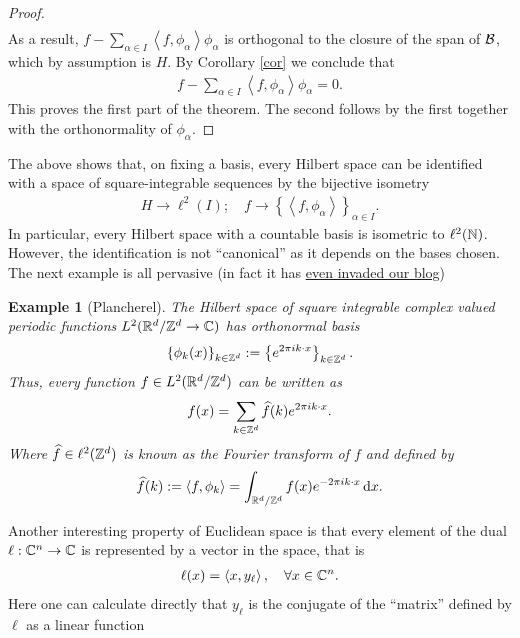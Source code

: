 \documentclass[12pt]{article}
\newtheorem{example}{Example}
\newcommand{\br}[1]{\left\langle#1\right\rangle} \newcommand{\set}[1]{\left\{#1\right\}}\newcommand{\qt}[1]{\left(#1\right)} \newcommand{\qp}[1]{\left(#1\right)}\newcommand{\qb}[1]{\left[#1\right]}
\renewcommand{\d}{\,\mathrm{d}}
\begin{document}
\begin{CJK*}{UTF8}{gbsn}
\begin{proof}
\begin{align*}
		\end{align*}
		As a result, $f-\sum_{\alpha \in  I} \br{f,\phi_\alpha}\phi_\alpha$ is orthogonal to the closure of the span of $\mathcal{B}$, which by assumption is $H$. By Corollary
		\ref{cor} we conclude that
		\begin{align*}
			f-\sum_{\alpha \in  I} \br{f,\phi_\alpha}\phi_\alpha=0.
		\end{align*}
		This proves the first part of the theorem. The second follows by the first together with the orthonormality of $\phi_\alpha$.
	\end{proof}
	The above shows that, on fixing a basis, every Hilbert space can be identified with a space of square-integrable sequences by the bijective isometry
	\begin{align*}
		H\to \ell ^2(I); \quad f \to \set{\br{f,\phi_{\alpha}}}_{\alpha \in I}.
	\end{align*}
	In particular, every Hilbert space with a countable basis is isometric to $\ell ^2(\mathbb{N})$. However, the identification is not ``canonical'' as it depends on the bases chosen. The next example is all pervasive (in fact it has \href{https://nowheredifferentiable.com/2023-01-29-PDE-1/}{even invaded our blog})
	\begin{example}[Plancherel]
		The Hilbert space of square integrable complex valued periodic functions $L^2(\mathbb{R}^d /\mathbb{Z}^d \to \mathbb{C})$ has orthonormal basis
		\begin{align*}
			\set{\phi_k(x)}_{k \in \Z^d}:=\set{e^{2\pi i  k \cdot x }}_{k \in \Z^d}.
		\end{align*}
		Thus, every function $f \in L^2(\mathbb{R}^d /\mathbb{Z}^d) $ can be written as
		\begin{align*}
			f(x)= \sum_{k \in  \mathbb{Z}^d}\widehat{f}(k)e^{2\pi i  k \cdot x } .
		\end{align*}
		Where  $\widehat{f} \in \ell ^2(\mathbb{Z}^d)$ is known as the Fourier transform of $f$ and defined by
		\begin{align*}
			\wh{f}(k):= \br{f, \phi_k}= \int_{\R^d/ \Z^d} f(x)e^{-2 \pi i k \cdot x} \d x .
		\end{align*}
	\end{example}
	Another interesting property of Euclidean space is that every element of the dual $\ell :\mathbb{C}^n \to \mathbb{C}$ is represented by a vector in the space, that is
	\begin{align*}
		\ell (x)= \br{x,y_\ell }, \quad\forall  x \in \C^n.
	\end{align*}
	Here one can calculate directly that $y_\ell $ is the conjugate of the ``matrix'' defined by $\ell $ as a linear function

\end{CJK*}
\end{document}

